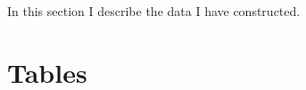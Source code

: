 \documentclass[notitlepage,11pt]{article}%
\begin{document}
In this section I describe the data I have constructed.





\appendix{}

\section{Tables}%

\setcounter{table}{0}
\renewcommand{\thetable}{A\arabic{table}}%
%

\newpage%
%

%
%

\newpage%
%

%
%

\newpage%
%

%
%

%
%

\newpage%
%
\end{document}
